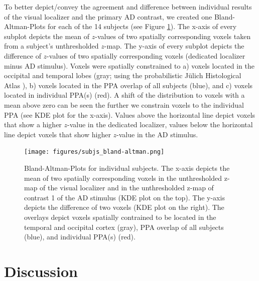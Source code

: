 \documentclass[english]{article}
\begin{document}
To better depict/convey the agreement and difference between individual results
of the visual localizer and the primary AD contrast, we created one
Bland-Altman-Plots for each of the 14 subjects (see Figure
\ref{fig:bland-altman}).
The x-axis of every subplot depicts the mean of $z$-values of two spatially
corresponding voxels taken from a subject's unthresholded $z$-map.
The y-axis of every subplot depicts the difference of $z$-values of two
spatially corresponding voxels (dedicated localizer minus AD stimulus).
Voxels were spatially constrained to a) voxels located in the occipital and
temporal lobes (gray; using the probabilistic Jülich Histological Atlas
\citep{eickhoff2005toolbox, eickhoff2007assignment}), b) voxels located in the
PPA overlap of all subjects (blue), and c) voxels located in individual PPA(s)
(red).
A shift of the distribution to voxels with a mean above zero can be seen the
further we constrain voxels to the individual PPA (see KDE plot for the x-axis).
Values above the horizontal line depict voxels that show a higher $z$-value in
the dedicated localizer, values below the horizontal line depict voxels that
show higher $z$-value in the AD stimulus.

\begin{figure} \centering
    \texttt{[image: figures/subjs\_bland-altman.png]}
    \caption{Bland-Altman-Plots for individual subjects. The x-axis depicts the
        mean of two spatially corresponding voxels in the unthresholded z-map of
        the visual localizer and in the unthresholded z-map of contrast 1 of the
        AD stimulus (KDE plot on the top). The y-axis depicts the difference of
        two voxels (KDE plot on the right).
        The overlays depict voxels spatially contrained to be located in the
        temporal and occipital cortex (gray),
        PPA overlap of all subjects (blue),
        and individual PPA(s) (red).}
    \label{fig:bland-altman} \end{figure}


\section{Discussion}

\end{document}

